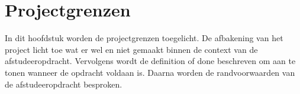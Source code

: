 \chapter{Projectgrenzen}
In dit hoofdstuk worden de projectgrenzen toegelicht.
De afbakening van het project licht toe wat er wel en niet gemaakt binnen de context van de afstudeeropdracht.
Vervolgens wordt de definition of done beschreven om aan te tonen wanneer de opdracht voldaan is.
Daarna worden de randvoorwaarden van de afstudeeropdracht besproken.





